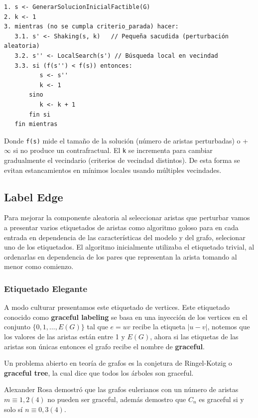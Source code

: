 \documentclass[a4paper]{article}
\begin{document}
\begin{verbatim}
1. s <- GenerarSolucionInicialFactible(G)
2. k <- 1
3. mientras (no se cumpla criterio_parada) hacer:
   3.1. s' <- Shaking(s, k)   // Pequeña sacudida (perturbación aleatoria)
   3.2. s'' <- LocalSearch(s') // Búsqueda local en vecindad
   3.3. si (f(s'') < f(s)) entonces:
          s <- s''
          k <- 1
       sino
          k <- k + 1
       fin si
   fin mientras
\end{verbatim}

Donde \texttt{f(s)} mide el tamaño de la solución (número de aristas perturbadas) o +\(\infty\) si no produce un contrafractual.  
El \texttt{k} se incrementa para cambiar gradualmente el vecindario (criterios de vecindad distintos).  
De esta forma se evitan estancamientos en mínimos locales usando múltiples vecindades.


\subsection{Label Edge}

Para mejorar la componente aleatoria al seleccionar aristas que perturbar vamos a presentar varios etiquetados de aristas como algoritmo goloso para en cada entrada en dependencia de las caracter\'isticas del modelo y del grafo, selecionar uno de los etiquetados. El algoritmo inicialmente utilizaba el etiquetado trivial, al ordenarlas en dependencia de los pares que representan la arista tomando al menor como comienzo.

\subsubsection{Etiquetado Elegante}

A modo culturar presentamos este etiquetado de vertices. Este etiquetado conocido como \textbf{graceful labeling} se basa en una inyecci\'on de los vertices en el conjunto $\{0, 1, ..., E(G)\}$ tal que $e=uv$ recibe la etiqueta $|u - v|$, notemos que los valores de las aristas est\'an entre 1 y $E(G)$, ahora si las etiquetas de las aristas son \'unicas entonces el grafo recibe el nombre de \textbf{graceful}.

Un problema abierto en teor\'ia de grafos es la conjetura de Ringel-Kotzig o  \textbf{graceful tree}, la cual dice que todos los \'arboles son graceful.

Alexander Rosa demostr\'o que las grafos eulerianos con un n\'umero de aristas $m \equiv 1, 2 (4)$ no pueden ser graceful, adem\'as demostro que $C_n$ es graceful si y solo s\'i $n \equiv 0,3 (4)$.
\end{document}
